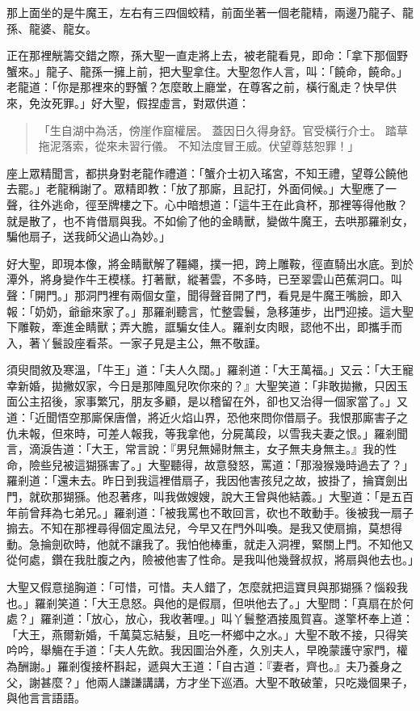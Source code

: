 那上面坐的是牛魔王，左右有三四個蛟精，前面坐著一個老龍精，兩邊乃龍子、龍孫、龍婆、龍女。

正在那裡觥籌交錯之際，孫大聖一直走將上去，被老龍看見，即命：「拿下那個野蟹來。」龍子、龍孫一擁上前，把大聖拿住。大聖忽作人言，叫：「饒命，饒命。」老龍道：「你是那裡來的野蟹？怎麼敢上廳堂，在尊客之前，橫行亂走？快早供來，免汝死罪。」好大聖，假捏虛言，對眾供道：
\begin{quote}
「生自湖中為活，傍崖作窟權居。
蓋因日久得身舒。官受橫行介士。
踏草拖泥落索，從來未習行儀。
不知法度冒王威。伏望尊慈恕罪！」
\end{quote}

座上眾精聞言，都拱身對老龍作禮道：「蟹介士初入瑤宮，不知王禮，望尊公饒他去罷。」老龍稱謝了。眾精即教：「放了那廝，且記打，外面伺候。」大聖應了一聲，往外逃命，徑至牌樓之下。心中暗想道：「這牛王在此貪杯，那裡等得他散？就是散了，也不肯借扇與我。不如偷了他的金睛獸，變做牛魔王，去哄那羅剎女，騙他扇子，送我師父過山為妙。」

好大聖，即現本像，將金睛獸解了韁繩，撲一把，跨上雕鞍，徑直騎出水底。到於潭外，將身變作牛王模樣。打著獸，縱著雲，不多時，已至翠雲山芭蕉洞口。叫聲：「開門。」那洞門裡有兩個女童，聞得聲音開了門，看見是牛魔王嘴臉，即入報：「奶奶，爺爺來家了。」那羅剎聽言，忙整雲鬟，急移蓮步，出門迎接。這大聖下雕鞍，牽進金睛獸；弄大膽，誆騙女佳人。羅剎女肉眼，認他不出，即攜手而入，著丫鬟設座看茶。一家子見是主公，無不敬謹。

須臾間敘及寒溫，「牛王」道：「夫人久闊。」羅剎道：「大王萬福。」又云：「大王寵幸新婚，拋撇奴家，今日是那陣風兒吹你來的？』大聖笑道：「非敢拋撇，只因玉面公主招後，家事繁冗，朋友多顧，是以稽留在外，卻也又治得一個家當了。」又道：「近聞悟空那廝保唐僧，將近火焰山界，恐他來問你借扇子。我恨那廝害子之仇未報，但來時，可差人報我，等我拿他，分屍萬段，以雪我夫妻之恨。」羅剎聞言，滴淚告道：「大王，常言說：『男兒無婦財無主，女子無夫身無主。』我的性命，險些兒被這猢猻害了。」大聖聽得，故意發怒，罵道：「那潑猴幾時過去了？」羅剎道：「還未去。昨日到我這裡借扇子，我因他害孩兒之故，披掛了，掄寶劍出門，就砍那猢猻。他忍著疼，叫我做嫂嫂，說大王曾與他結義。」大聖道：「是五百年前曾拜為七弟兄。」羅剎道：「被我罵也不敢回言，砍也不敢動手。後被我一扇子搧去。不知在那裡尋得個定風法兒，今早又在門外叫喚。是我又使扇搧，莫想得動。急掄劍砍時，他就不讓我了。我怕他棒重，就走入洞裡，緊關上門。不知他又從何處，鑽在我肚腹之內，險被他害了性命。是我叫他幾聲叔叔，將扇與他去也。」

大聖又假意搥胸道：「可惜，可惜。夫人錯了，怎麼就把這寶貝與那猢猻？惱殺我也。」羅剎笑道：「大王息怒。與他的是假扇，但哄他去了。」大聖問：「真扇在於何處？」羅剎道：「放心，放心，我收著哩。」叫丫鬟整酒接風賀喜。遂擎杯奉上道：「大王，燕爾新婚，千萬莫忘結髮，且吃一杯鄉中之水。」大聖不敢不接，只得笑吟吟，舉觴在手道：「夫人先飲。我因圖治外產，久別夫人，早晚蒙護守家門，權為酬謝。」羅剎復接杯斟起，遞與大王道：「自古道：『妻者，齊也。』夫乃養身之父，謝甚麼？」他兩人謙謙講講，方才坐下巡酒。大聖不敢破葷，只吃幾個果子，與他言言語語。


